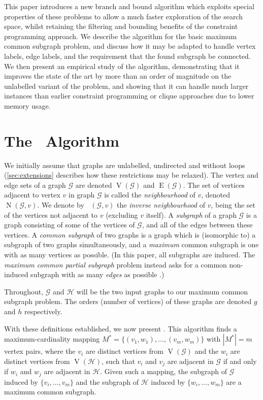 \documentclass[letterpaper]{article}
\newcommand{\citep}[1]{\cite{#1}}
\newcommand{\McSplit}{\textproc{McSplit}}
\newcommand{\graphG}{\mathcal{G}}
\newcommand{\graphH}{\mathcal{H}}
\DeclareMathOperator{\V}{V}
\DeclareMathOperator{\E}{E}
\DeclareMathOperator{\N}{N}
\DeclareMathOperator{\invN}{\overline{N}}
\begin{document}
This paper introduces a new branch and bound algorithm which exploits special
properties of these problems to allow a much faster exploration of the search
space, whilst retaining the filtering and bounding benefits of the constraint
programming approach. We describe the algorithm for the basic maximum common
subgraph problem, and discuss how it may be adapted to handle vertex labels,
edge labels, and the requirement that the found subgraph be connected. We then
present an empirical study of the algorithm, demonstrating that it improves the
state of the art by more than an order of magnitude on the unlabelled variant
of the problem, and showing that it can handle much larger instances than
earlier constraint programming or clique approaches due to lower memory usage.

\section{The \McSplit\ Algorithm}

We initially assume that graphs are unlabelled, undirected and without loops
(\cref{sec:extensions} describes how these restrictions may be relaxed).
The vertex and edge sets of a graph $\graphG$ are denoted $\V(\graphG)$ and $\E(\graphG)$.  The
set of vertices adjacent to vertex $v$ in graph $\graphG$ is called the
\emph{neighbourhood} of $v$, denoted $\N(\graphG, v)$. We denote by $\invN(\graphG, v)$ the
\emph{inverse neighbourhood} of $v$, being the set of the vertices not adjacent
to $v$ (excluding $v$ itself). A \emph{subgraph} of a graph $\graphG$ is a graph
consisting of some of the vertices of $\graphG$, and all of the edges between these
vertices. A \emph{common subgraph} of two graphs is a graph which is
(isomorphic to) a subgraph of two graphs simultaneously, and a \emph{maximum}
common subgraph is one with as many vertices as possible. (In this paper, all
subgraphs are induced. The \emph{maximum common partial subgraph} problem
instead asks for a common non-induced subgraph with as many \emph{edges} as
possible \citep{DBLP:conf/cp/NdiayeS11}.)

Throughout, $\graphG$ and $\graphH$ will be the two input graphs to our maximum
common subgraph problem.  The orders (number of vertices) of these graphs are
denoted $g$ and $h$ respectively.

With these definitions established, we now present \McSplit. This algorithm
finds a maximum-cardinality mapping $M^* = \{(v_1, w_1), \dots, (v_{m},
w_{m})\}$ with $|M^*| = m$ vertex pairs, where the $v_i$ are distinct vertices
from $\V(\graphG)$ and the $w_i$ are distinct vertices from $\V(\graphH)$, such
that $v_i$ and $v_j$ are adjacent in $\graphG$ if and only if $w_i$ and $w_j$
are adjacent in $\graphH$.  Given such a mapping, the subgraph of $\graphG$
induced by $\{v_i, \dots, v_{m}\}$ and the subgraph of $\graphH$ induced by
$\{w_i, \dots, w_{m}\}$ are a maximum common subgraph.
\end{document}
